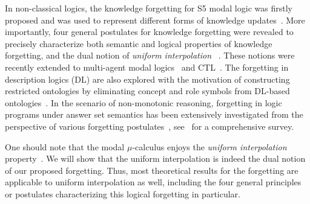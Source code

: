 \documentclass[sn-mathphys]{sn-jnl}%
\theoremstyle{thmstyleone}%
\theoremstyle{thmstyletwo}%
\theoremstyle{thmstylethree}%
\begin{document}
In non-classical logics,
the knowledge forgetting for S5 modal logic was firstly proposed and was used to represent different forms of knowledge updates~\cite{Yan:AIJ:2009}.
More importantly, four general postulates for knowledge forgetting were revealed to precisely characterize both
semantic and logical properties of knowledge forgetting, and the dual notion of \emph{uniform interpolation} ~\cite{visser1996uniform}.
% 
These notions were recently extended to multi-agent modal logics~\cite{fang2019forgetting} and CTL~\cite{feng2020sufficient}.
The forgetting in description logics (DL) are also explored with the motivation of constructing restricted ontologies by eliminating concept and role symbols from DL-based
ontologies~\cite{Wang:AMAI:2010,Lutz:IJCAI:2011,Konev:JAIR:2012,Zhao:2017:IJCAI,DBLP:conf/aaai/ZhaoSWZF20}. 
In the scenario of non-monotonic reasoning,  forgetting in logic programs under answer set semantics has been extensively investigated from the perspective of various forgetting postulates~\cite{DBLP:Zhang:AIJ2006,DBLP:journals/ai/EiterW08,Wong:PhD:Thesis,DBLP:journals/jair/WangZZZ14,wang2013forgetting,DBLP:journals/jair/Delgrande17,gonccalves2020limits}, see~\cite{eiter2019brief,gonccalves2021forgetting} for a comprehensive survey.

One should note that  the modal $\mu$-calculus enjoys the \emph{uniform interpolation} property~\cite{d1996uniform}. 
We will show that the uniform interpolation is indeed the dual notion of our proposed forgetting. Thus, most theoretical results for
the forgetting are applicable to uniform interpolation as well, including the four general principles or postulates characterizing 
this logical forgetting in particular.
\end{document}
